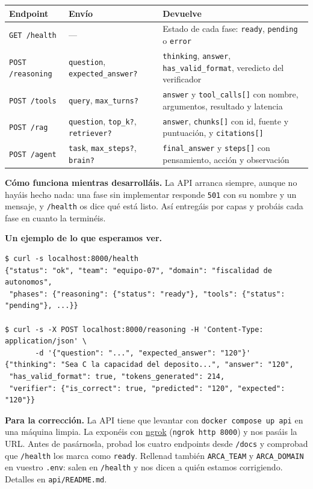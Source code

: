 \documentclass[11pt,a4paper]{article}
\newcommand{\code}[1]{{\small\texttt{#1}}}
\newcommand{\file}[1]{{\small\texttt{\textcolor{arcablue}{#1}}}}
\begin{document}
\begin{center}
\small
\begin{tabularx}{\textwidth}{@{}l l X@{}}
\toprule
\textbf{Endpoint} & \textbf{Envío} & \textbf{Devuelve} \\
\midrule
\code{GET /health} & --- & Estado de cada fase: \code{ready}, \code{pending} o \code{error} \\
\code{POST /reasoning} & \code{question}, \code{expected\_answer?} & \code{thinking},
  \code{answer}, \code{has\_valid\_format}, veredicto del verificador \\
\code{POST /tools} & \code{query}, \code{max\_turns?} & \code{answer} y \code{tool\_calls[]}
  con nombre, argumentos, resultado y latencia \\
\code{POST /rag} & \code{question}, \code{top\_k?}, \code{retriever?} & \code{answer},
  \code{chunks[]} con id, fuente y puntuación, y \code{citations[]} \\
\code{POST /agent} & \code{task}, \code{max\_steps?}, \code{brain?} &
  \code{final\_answer} y \code{steps[]} con pensamiento, acción y observación \\
\bottomrule
\end{tabularx}
\end{center}

\textbf{Cómo funciona mientras desarrolláis.} La API arranca siempre, aunque no hayáis hecho
nada: una fase sin implementar responde \code{501} con su nombre y un mensaje, y
\code{/health} os dice qué está listo. Así entregáis por capas y probáis cada fase en cuanto
la terminéis.

\textbf{Un ejemplo de lo que esperamos ver.}

{\footnotesize
\begin{verbatim}
$ curl -s localhost:8000/health
{"status": "ok", "team": "equipo-07", "domain": "fiscalidad de autonomos",
 "phases": {"reasoning": {"status": "ready"}, "tools": {"status": "pending"}, ...}}

$ curl -s -X POST localhost:8000/reasoning -H 'Content-Type: application/json' \
       -d '{"question": "...", "expected_answer": "120"}'
{"thinking": "Sea C la capacidad del deposito...", "answer": "120",
 "has_valid_format": true, "tokens_generated": 214,
 "verifier": {"is_correct": true, "predicted": "120", "expected": "120"}}
\end{verbatim}
}
\vspace{-1.6ex}

\begin{nota}
\textbf{Para la corrección.} La API tiene que levantar con \code{docker compose up api} en
una máquina limpia. La exponéis con \href{https://ngrok.com/}{ngrok} (\code{ngrok http 8000})
y nos pasáis la URL. Antes de pasárnosla, probad los cuatro endpoints desde \code{/docs} y
comprobad que \code{/health} los marca como \code{ready}. Rellenad también \code{ARCA\_TEAM}
y \code{ARCA\_DOMAIN} en vuestro \code{.env}: salen en \code{/health} y nos dicen a quién
estamos corrigiendo. Detalles en \file{api/README.md}.
\end{nota}
\end{document}
